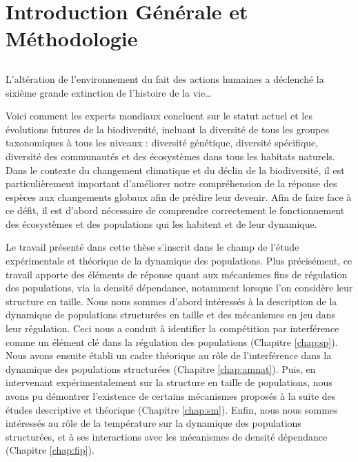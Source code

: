 \part{Introduction Générale et Méthodologie}

\chapter*[Introduction]{}

\vspace{-5cm}

\og L'altération de l'environnement du fait des actions
humaines a déclenché la sixième grande extinction de l'histoire de la vie\ldots\fg
\autocites{stuart-chapin-iii2000a}

Voici comment les experts mondiaux concluent sur le statut actuel et les
évolutions futures de la biodiversité, incluant la diversité de tous les groupes
taxonomiques à tous les niveaux : diversité génétique, diversité spécifique,
diversité des communautés et des écosystèmes dans tous les habitats naturels.
Dans le contexte du changement climatique et du déclin de la biodiversité, il
est particulièrement important d'améliorer notre compréhension de la réponse
des espèces aux changements globaux afin de prédire leur devenir. Afin de faire
face à ce défit, il est d'abord nécessaire de comprendre correctement le
fonctionnement des écosystèmes et des populations qui les habitent et de leur
dynamique. 

Le travail présenté dans cette thèse s'inscrit dans le champ de l'étude
expérimentale et théorique de la dynamique des populations. Plus précisément, ce
travail apporte des éléments de réponse quant aux mécanismes fins de régulation
des populations, via la densité dépendance, notamment lorsque l'on considère
leur structure en taille.
Nous nous sommes d'abord intéressés à la description de la dynamique
de populations structurées en taille et des mécanismes en jeu dans leur
régulation. Ceci nous a conduit à identifier la compétition par interférence
comme un élément clé dans la régulation des populations (Chapitre
\ref{chap:sp}).
Nous avons ensuite établi un cadre théorique au rôle de l'interférence dans la
dynamique des populations structurées (Chapitre \ref{chap:amnat}). Puis, en
intervenant expérimentalement sur la structure en taille de populations, nous avons pu démontrer 
l'existence de certains mécanismes proposés à la suite des études descriptive et
théorique (Chapitre \ref{chap:sm}).
Enfin, nous nous sommes intéressés au rôle de la température sur la dynamique
des populations structurées, et à ses interactions avec les mécanismes de densité
dépendance (Chapitre \ref{chap:fip}).





